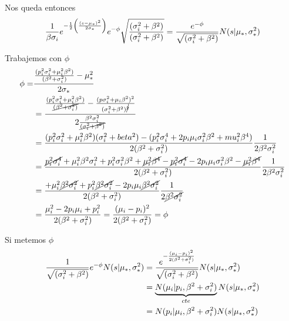 \documentclass[11pt,twoside, spanish]{report} %
\begin{document}
Nos queda entonces
\begin{equation}
	\centering
	\frac{1}{\beta\sigma_i}e^{-\frac{1}{2}\left( \frac{(s-\mu_{\ast})^2}{2\sigma_{\ast}}\right)}e^{-\phi}\sqrt{\frac{(\sigma_i^2+\beta^2)}{(\sigma_i^2+\beta^2)}}
	= \frac{e^{-\phi}}{\sqrt{(\sigma_i^2+\beta^2)}}N(s \vert\mu_{\ast},\sigma_{\ast}^2)
\end{equation}

Trabajemos con $\phi$
\begin{equation}
	\centering
	\begin{split}
		\phi = & \frac{\frac{(p_i^2\sigma_i^2+\mu_i^2\beta^2)}{(\beta^2+\sigma_i^2)}-\mu_{\ast}^2}{2\sigma_{\ast}}\\
		& = \frac{\frac{(p_i^2\sigma_i^2+\mu_i^2\beta^2)}{\cancel{(\beta^2+\sigma_i^{2})}}-\frac{(p\sigma_i^2+\mu_i\beta^2)^2}{(\sigma_i^2+\beta^2)^{\cancel{2}}}}{2\frac{\beta^2\sigma_i^2}{\cancel{(\sigma_i^2+\beta^2)}}}\\
		& =\frac{(p_i^2\sigma_i^2+\mu_i^2\beta^2)(\sigma_i^2+beta^2)-(p_i^2\sigma_i^4+2p_i\mu_i\sigma_i^2\beta^2+mu_i^2\beta^4)}{2(\beta^2+\sigma_i^2)}\frac{1}{2\beta^2\sigma_i^2}\\
		& = \frac{\cancel{p_i^2\sigma_i^4}+\mu_i^2\beta^2\sigma_i^2+p_i^2\sigma_i^2\beta^2+\cancel{\mu_i^2\beta^4}-\cancel{p_i^2\sigma_i^4}-2p_i\mu_i\sigma_i^2\beta^2-\cancel{\mu_i^2\beta^4}}{2(\beta^2+\sigma_i^2)}\frac{1}{2\beta^2\sigma_i^2}\\
		& = \frac{+\mu_i^2\cancel{\beta^2\sigma_i^2}+p_i^2\cancel{\beta^2\sigma_i^2}-2p_i\mu_i\cancel{\beta^2\sigma_i^2}}{2(\beta^2+\sigma_i^2)}\frac{1}{2\cancel{\beta^2\sigma_i^2}}\\
		& = \frac{\mu_i^2-2p_i\mu_i+p_i^2}{2(\beta^2+\sigma_i^2)} = \frac{(\mu_i-p_i)^2}{2(\beta^2+\sigma_i^2)} = \phi
	\end{split}
\end{equation}

Si metemos $\phi$
\begin{equation}
	\centering
	\begin{split}
		\frac{1}{\sqrt{(\sigma_i^2+\beta^2)}}e^{-\phi}N(s \vert\mu_{\ast},\sigma_{\ast}^2)
		& =\frac{e^{-\frac{(\mu_i-p_i)^2}{2(\beta^2+\sigma_i^2)}}}{\sqrt{(\sigma_i^2+\beta^2)}}N(s \vert\mu_{\ast},\sigma_{\ast}^2)\\
		& = \underbrace{N(\mu_i\vert p_i,\beta^2+\sigma_i^2)}_{cte}N(s \vert\mu_{\ast},\sigma_{\ast}^2)\\
		& = N(p_i\vert \mu_i,\beta^2+\sigma_i^2)N(s \vert\mu_{\ast},\sigma_{\ast}^2)
	\end{split}
\end{equation}
\end{document}

